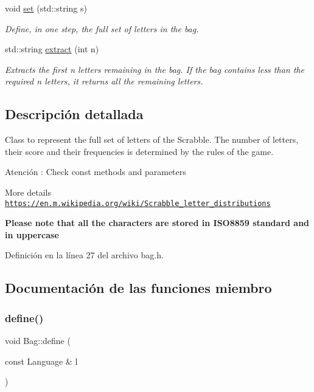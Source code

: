 \begin{DoxyCompactItemize}
void \hyperlink{classBag_a3de5aa1629a7fdd40630d140adde2757}{set} (std\+::string s)
\begin{DoxyCompactList}\small\item\em Define, in one step, the full set of letters in the bag. \end{DoxyCompactList}\item 
std\+::string \hyperlink{classBag_ac75abe2b7626e50109a1add3382978af}{extract} (int n)
\begin{DoxyCompactList}\small\item\em Extracts the first {\ttfamily n} letters remaining in the bag. If the bag contains less than the required {\ttfamily n} letters, it returns all the remaining letters. \end{DoxyCompactList}\end{DoxyCompactItemize}


\subsection{Descripción detallada}
Class to represent the full set of letters of the Scrabble. The number of letters, their score and their frequencies is determined by the rules of the game. 

\begin{DoxyWarning}{Atención}
\+: Check const methods and parameters
\end{DoxyWarning}
More details \href{https://en.m.wikipedia.org/wiki/Scrabble_letter_distributions}{\tt https\+://en.\+m.\+wikipedia.\+org/wiki/\+Scrabble\+\_\+letter\+\_\+distributions}

{\bfseries Please note that all the characters are stored in I\+S\+O8859 standard and in uppercase} 

Definición en la línea 27 del archivo bag.\+h.



\subsection{Documentación de las funciones miembro}
\mbox{\label{classBag_ad380d36f2628b3ffe0ca19cfe53d7c19}} 
\subsubsection{\texorpdfstring{define()}{define()}}
{\footnotesize\ttfamily void Bag\+::define (\begin{DoxyParamCaption}\item[{const Language \&}]{l }\end{DoxyParamCaption})}



